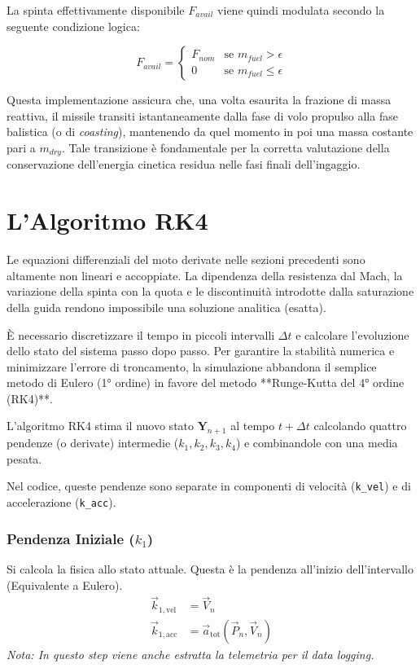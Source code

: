 \documentclass[12pt,a4paper]{article}
\begin{document}
La spinta effettivamente disponibile $F_{avail}$ viene quindi modulata secondo la seguente condizione logica:

\begin{equation}
    F_{avail} = 
    \begin{cases} 
        F_{nom} & \text{se } m_{fuel} > \epsilon \\
        0 & \text{se } m_{fuel} \le \epsilon
    \end{cases}
\end{equation}

Questa implementazione assicura che, una volta esaurita la frazione di massa reattiva, il missile transiti istantaneamente dalla fase di volo propulso alla fase balistica (o di \textit{coasting}), mantenendo da quel momento in poi una massa costante pari a $m_{dry}$. Tale transizione è fondamentale per la corretta valutazione della conservazione dell'energia cinetica residua nelle fasi finali dell'ingaggio.

\section{L'Algoritmo RK4}
Le equazioni differenziali del moto derivate nelle sezioni precedenti sono altamente non lineari e accoppiate. La dipendenza della resistenza dal Mach, la variazione della spinta con la quota e le discontinuità introdotte dalla saturazione della guida rendono impossibile una soluzione analitica (esatta).

È necessario discretizzare il tempo in piccoli intervalli $\Delta t$ e calcolare l'evoluzione dello stato del sistema passo dopo passo.
Per garantire la stabilità numerica e minimizzare l'errore di troncamento, la simulazione abbandona il semplice metodo di Eulero (1° ordine) in favore del metodo **Runge-Kutta del 4° ordine (RK4)**.

L'algoritmo RK4 stima il nuovo stato $\mathbf{Y}_{n+1}$ al tempo $t + \Delta t$ calcolando quattro pendenze (o derivate) intermedie ($k_1, k_2, k_3, k_4$) e combinandole con una media pesata.

Nel codice, queste pendenze sono separate in componenti di velocità (\texttt{k\_vel}) e di accelerazione (\texttt{k\_acc}).

\subsubsection{Pendenza Iniziale ($k_1$)}
Si calcola la fisica allo stato attuale. Questa è la pendenza all'inizio dell'intervallo (Equivalente a Eulero).
\begin{align}
    \vec{k}_{1, \text{vel}} &= \vec{V}_n \\
    \vec{k}_{1, \text{acc}} &= \vec{a}_{\text{tot}}(\vec{P}_n, \vec{V}_n)
\end{align}
\textit{Nota: In questo step viene anche estratta la telemetria per il data logging.}
\end{document}
